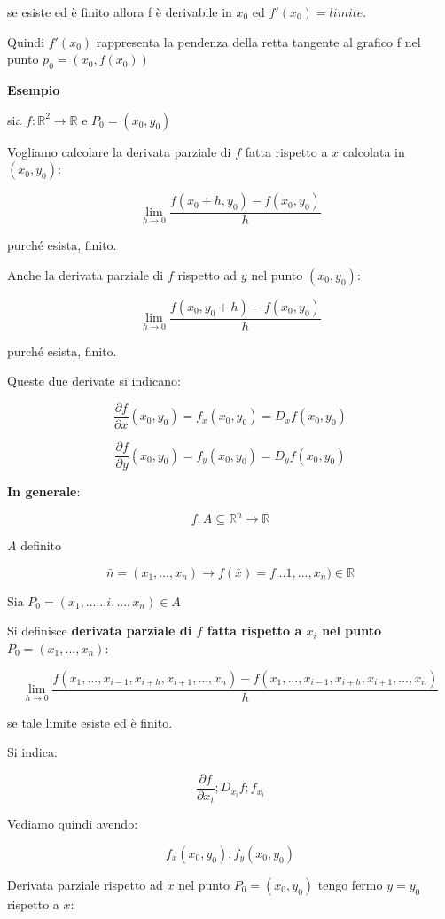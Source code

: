 \documentclass[11pt]{article}
\begin{document}
se esiste ed è finito allora f è derivabile in $x_0$ ed $f'(x_0) = limite$.

Quindi $f'(x_0)$ rappresenta la pendenza della retta tangente al grafico f nel punto $p_0=(x_0,f(x_0))$

\textbf{Esempio} 

sia $f: \mathbb{R}^{2}\rightarrow \mathbb{R}$ e $P_0=(x_0,y_0)$ 

Vogliamo calcolare la derivata parziale di $f$ fatta rispetto a $x$ calcolata in $(x_0,y_0)$:

\[
    \lim_{ h \to 0 } \frac{f(x_0+h,y_0) -f(x_0,y_0)}{h}
\]

purché esista, finito.

Anche la derivata parziale di $f$ rispetto ad $y$ nel punto $(x_0,y_0)$:

\[
    \lim_{ h \to 0 } \frac{f(x_0,y_0+h) - f(x_0,y_0)}{h}
\]

purché esista, finito.

Queste due derivate si indicano:

\[
    \frac{\partial f}{\partial x}(x_0,y_0) = f_x(x_0,y_0) = D_xf(x_0,y_0)
\]

\[
    \frac{\partial f}{\partial y}(x_0,y_0) = f_y(x_0,y_0)= D_yf(x_0,y_0)
\]

\textbf{In generale}:

\[
    f: A \subseteq \mathbb{R}^{n} \rightarrow \mathbb{R}
\]

$A$ definito

\[
    \bar{n} = (x_1, \ldots ,x_n) \rightarrow f(\bar{x} ) = f \ldots 1,...,x_n) \in \mathbb{R}
\]

Sia $P_0= (x_1, \ldots  \ldots i,...,x_n) \in A$

Si definisce \textbf{derivata parziale di $f$ fatta rispetto a $x_i$ nel punto $P_0=(x_1, \ldots ,x_n)$}:

\[
    \lim_{ h \to 0 } \frac{f(x_1,\ldots,x_{i-1},x_{i+h},x_{i+1},\ldots,x_n) - f(x_1,\ldots,x_{i-1},x_{i+h},x_{i+1},\ldots,x_n)}{h}
\]

se tale limite esiste ed è finito.

Si indica:

\[
    \frac{\partial f}{\partial x_i}; D_{x_i}f;f_{x_i}
\]

Vediamo quindi avendo:

\[
    f_x(x_0,y_0),f_y(x_0,y_0)
\]

Derivata parziale rispetto ad $x$ nel punto $P_0=(x_0,y_0)$ tengo fermo $y=y_0$ rispetto a $x$:
\end{document}
